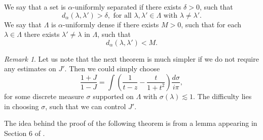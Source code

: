 \documentclass{article}[12pt]
\theoremstyle{remark}
\newtheorem{remark}{Remark}
\begin{document}
    We say that a set is $\alpha$-uniformly separated if there exists $\delta > 0$, such that
    \begin{equation*}
        d_{\alpha}(\lambda,\lambda') > \delta, \text{ for all } \lambda, \lambda' \in \Lambda \text{ with } \lambda \neq \lambda'.
    \end{equation*}
    We say that $\Lambda$ is $\alpha$-uniformly dense if there exists $M > 0$, such that for each $\lambda \in \Lambda$ there exists $\lambda'\neq \lambda$ in $\Lambda$, such that
    \begin{equation*}
        d_{\alpha}(\lambda,\lambda') < M.
    \end{equation*}
    \begin{remark}
        Let us note that the next theorem is much simpler if we do not require any estimates on $J'$. Then we could simply choose
        \begin{equation*}
            \frac{1+J}{1-J} = \int \left( \frac{1}{t-z} - \frac{t}{1+t^{2}}\right)\frac{d\sigma}{i\pi},
        \end{equation*}
        for some discrete measure $\sigma$ supported on $\Lambda$ with $\sigma(\lambda) \lesssim 1$. The difficulty lies in choosing $\sigma$, such that we can control $J'$.
    \end{remark}
    The idea behind the proof of the following theorem is from a lemma appearing in Section 6 of \cite{MR2609247}.
    
\end{document}
